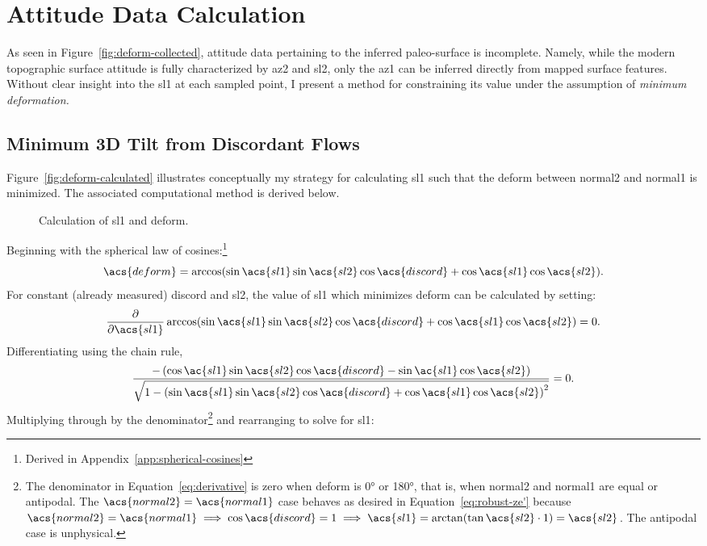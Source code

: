 \section{Attitude Data Calculation}\label{sec:calculation}

As seen in Figure~\ref{fig:deform-collected}, attitude data pertaining to the inferred paleo-surface is incomplete. Namely, while the modern topographic surface attitude is fully characterized by \acs{az2} and \acs{sl2}, only the \acf{az1} can be inferred directly from mapped surface features. Without clear insight into the \acf{sl1} at each sampled point, I present a method for constraining its value under the assumption of \emph{minimum deformation.} 

\subsection{Minimum 3D Tilt from Discordant Flows}\label{sec:3d-deform}
Figure~\ref{fig:deform-calculated} illustrates conceptually my strategy for calculating \acs{sl1} such that the \acf{deform} between \acs{normal2} and \acs{normal1} is minimized. The associated computational method is derived below.
\begin{figure}
    \centering
    
    \caption{Calculation of \acf{sl1} and \acf{deform}.}\label{fig:deform}
\end{figure}
Beginning with the spherical law of cosines:\footnote{Derived in Appendix~\ref{app:spherical-cosines}}
\begin{equation}
    \acs{deform}
    =\arccos(\sin\acs{sl1}\sin\acs{sl2}\cos\acs{discord}
    +\cos\acs{sl1}\cos\acs{sl2}).
    \label{eq:central-angle}
\end{equation}
For constant (already measured) \acs{discord} and \acs{sl2}, the value of \acs{sl1} which minimizes \acs{deform} can be calculated by setting:
\begin{equation}
    \frac{\partial}{\partial \acs{sl1}}
    \arccos(\sin\acs{sl1}\sin\acs{sl2}\cos\acs{discord}
    +\cos\acs{sl1}\cos\acs{sl2})
    =0.\label{eq:mimimum}
\end{equation}
Differentiating using the chain rule,
\begin{equation}
    \frac{-\,(\cos\ac{sl1}\sin\acs{sl2}
    \cos\acs{discord}-\sin\ac{sl1}\cos\acs{sl2})}
    {\sqrt{1-{(\sin\acs{sl1}\sin\acs{sl2}\cos\acs{discord}
    +\cos\acs{sl1}\cos\acs{sl2})}^2}}
    =0.\label{eq:derivative}
\end{equation}
Multiplying through by the denominator\footnote{The denominator in Equation~\eqref{eq:derivative} is zero when \acs{deform} is \ang{0} or \ang{180}, that is, when \acs{normal2} and \acs{normal1} are equal or antipodal. The $\acs{normal2}=\acs{normal1}$ case behaves as desired in Equation~\eqref{eq:robust-ze'} because $\acs{normal2}=\acs{normal1}\implies\cos\acs{discord}=1\implies\acs{sl1}=\arctan(\tan\acs{sl2}\cdot1)=\acs{sl2}$. The antipodal case is unphysical.} and rearranging to solve for \acs{sl1}:
